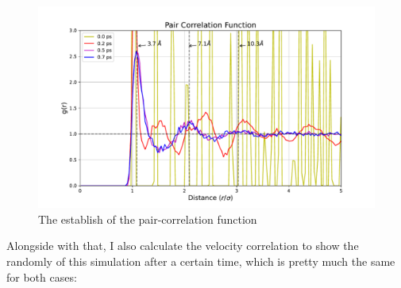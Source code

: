 \documentclass[a4paper]{article}
\begin{document}
\begin{figure}[!h]
	\centering
	\captionsetup{justification=centering}
	\hfill
\includegraphics[width=\textwidth]{Images/grint.pdf}
\caption{The establish of the pair-correlation function}
\end{figure}
\quad Alongside with that, I also calculate the velocity correlation to show the randomly of this simulation after a certain time, which is pretty much the same for both cases:\\
\end{document}
